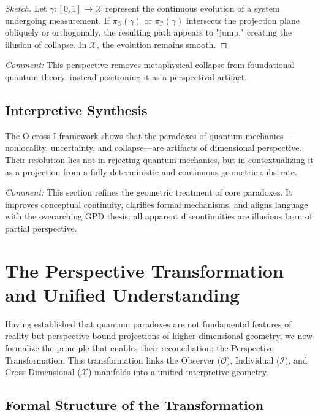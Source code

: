 \documentclass{article}
\begin{document}
\begin{proof}[Sketch]
Let $\gamma : [0,1] \rightarrow \mathcal{X}$ represent the continuous evolution of a system undergoing measurement. If $\pi_{\mathcal{O}}(\gamma)$ or $\pi_{\mathcal{I}}(\gamma)$ intersects the projection plane obliquely or orthogonally, the resulting path appears to "jump," creating the illusion of collapse. In $\mathcal{X}$, the evolution remains smooth.
\end{proof}

\textit{Comment:} This perspective removes metaphysical collapse from foundational quantum theory, instead positioning it as a perspectival artifact.

\subsection{Interpretive Synthesis}

The O-cross-I framework shows that the paradoxes of quantum mechanics—nonlocality, uncertainty, and collapse—are artifacts of dimensional perspective. Their resolution lies not in rejecting quantum mechanics, but in contextualizing it as a projection from a fully deterministic and continuous geometric substrate.

\textit{Comment:} This section refines the geometric treatment of core paradoxes. It improves conceptual continuity, clarifies formal mechanisms, and aligns language with the overarching GPD thesis: all apparent discontinuities are illusions born of partial perspective.



\section{The Perspective Transformation and Unified Understanding}

Having established that quantum paradoxes are not fundamental features of reality but perspective-bound projections of higher-dimensional geometry, we now formalize the principle that enables their reconciliation: the Perspective Transformation. This transformation links the Observer ($\mathcal{O}$), Individual ($\mathcal{I}$), and Cross-Dimensional ($\mathcal{X}$) manifolds into a unified interpretive geometry.

\subsection{Formal Structure of the Transformation}
\end{document}

